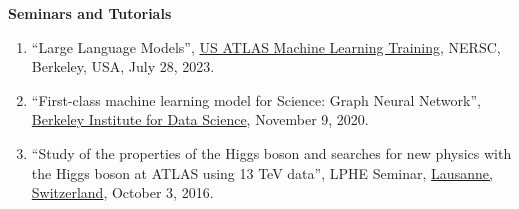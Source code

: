 
\textbf{Seminars and Tutorials}
\begin{enumerate}
    \item ``Large Language Models'', \href{https://indico.cern.ch/event/1264566/contributions/5514304/}{US ATLAS Machine Learning Training}, NERSC, Berkeley, USA, July 28, 2023.
    \item ``First-class machine learning model for Science: Graph Neural Network'', \href{https://bids.berkeley.edu/events/machine-learning-and-science-forum-2020-1109}{Berkeley Institute for Data Science}, November 9, 2020.
    
    
        
    
    \item ``Study of the properties of the Higgs boson and searches for new physics with the Higgs boson at ATLAS using 13 TeV data'', {LPHE Seminar}, 
    \href{http://lphe.epfl.ch/seminar/ext_semin.php}{Lausanne, Switzerland}, October 3, 2016.
        
\end{enumerate}




